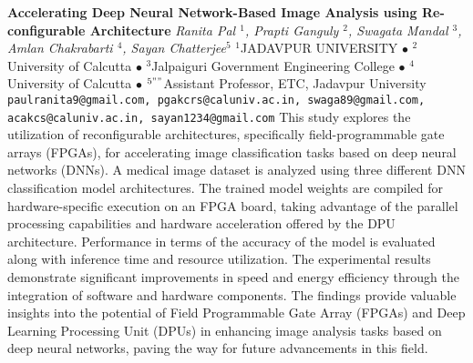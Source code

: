 
    \begin{conf-abstract}[]
        {\textbf{Accelerating Deep Neural Network-Based Image Analysis using Re-configurable Architecture}}
        {\textit{Ranita Pal $^{1}$, Prapti Ganguly $^{2}$, Swagata Mandal $^{3}$, Amlan Chakrabarti $^{4}$, Sayan Chatterjee$^{5}$}}
        {$^{1}$JADAVPUR UNIVERSITY $\bullet$ $^{2}$University of Calcutta $\bullet$ $^{3}$Jalpaiguri Government Engineering College $\bullet$ $^{4}$University of Calcutta $\bullet$ $^{5 ""}$Assistant Professor, ETC, Jadavpur University}
        {\texttt{paulranita9@gmail.com, pgakcrs@caluniv.ac.in, swaga89@gmail.com, acakcs@caluniv.ac.in, sayan1234@gmail.com}}
        {This study explores the utilization of reconfigurable architectures, specifically field-programmable gate arrays (FPGAs), for accelerating image classification tasks based on deep neural networks (DNNs). A medical image dataset is analyzed using three different DNN classification model architectures. The trained model weights are compiled for hardware-specific execution on an FPGA board, taking advantage of the parallel processing capabilities and hardware acceleration offered by the DPU architecture. Performance in terms of the accuracy of the model is evaluated along with inference time and resource utilization. The experimental results demonstrate significant improvements in speed and energy efficiency through the integration of software and hardware components. The findings provide valuable insights into the potential of Field Programmable Gate Array (FPGAs) and Deep Learning Processing Unit (DPUs) in enhancing image analysis tasks based on deep neural networks, paving the way for future advancements in this field.}
    \end{conf-abstract}
        